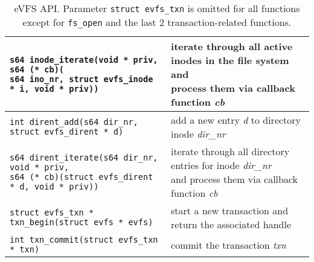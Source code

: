 \begin{table*}
\begin{center}
\begin{small}
\begin{tabular}[t]{|l|l|}
\makecell[l]{\texttt{s64 inode\_iterate(void * priv, s64 (* cb)(} \\ 
\hspace{1em}\texttt{s64 ino\_nr, struct evfs\_inode * i, void * priv))}} & \makecell[l]{iterate through all active inodes in the file system and \\ process them via callback function \textit{cb}} \\
\hline
\hline
\texttt{int dirent\_add(s64 dir\_nr, struct evfs\_dirent * d)} & add a new entry \textit{d} to directory inode \textit{dir\_nr} \\
\hline 
\makecell[l]{\texttt{s64 dirent\_iterate(s64 dir\_nr, void * priv,} \\ 
\hspace{1em}\texttt{s64 (* cb)(struct evfs\_dirent * d, void * priv))}} & \makecell[l]{iterate through all directory entries for inode \textit{dir\_nr} \\ and process them via callback function \textit{cb}} \\
\hline
\hline
\texttt{struct evfs\_txn * txn\_begin(struct evfs * evfs)} & start a new transaction and return the associated handle \\
\hline 
\texttt{int txn\_commit(struct evfs\_txn * txn)} & commit the transaction \textit{txn} \\
\hline 
\end{tabular}
\end{small}
\end{center}
\vspace{-16pt}
\caption{\label{tab:evfs-api}eVFS API. Parameter \texttt{struct evfs\_txn} is omitted for all functions except for \texttt{fs\_open} and the last 2 transaction-related functions.}
\vspace{-6pt}
\end{table*}


